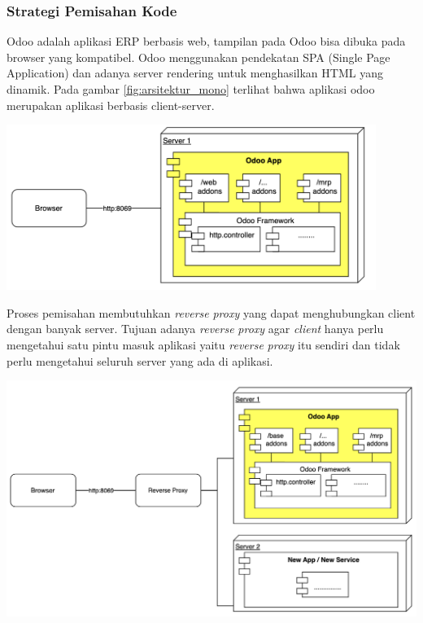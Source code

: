 \subsubsection{Strategi Pemisahan Kode}
Odoo adalah aplikasi ERP berbasis web, tampilan pada Odoo bisa dibuka pada browser yang kompatibel. Odoo menggunakan pendekatan SPA (Single Page Application) dan adanya server rendering untuk menghasilkan HTML yang dinamik. Pada gambar \ref{fig:arsitektur_mono} terlihat bahwa aplikasi odoo merupakan aplikasi berbasis client-server.
\begin{center}
	\includegraphics[width=12cm]{img/bab_3/mono_ori.png}
	\label{fig:arsitektur_mono}
\end{center}

Proses pemisahan membutuhkan \textit{reverse} \textit{proxy} yang dapat menghubungkan client dengan banyak server. Tujuan adanya \textit{reverse} \textit{proxy} agar \textit{client} hanya perlu mengetahui satu pintu masuk aplikasi yaitu \textit{reverse} \textit{proxy} itu sendiri dan tidak perlu mengetahui seluruh server yang ada di aplikasi.

\begin{center}
	\includegraphics[width=14cm]{img/bab_3/micro_proxy.png}
	\label{fig:arsitektu_micro}
\end{center}

